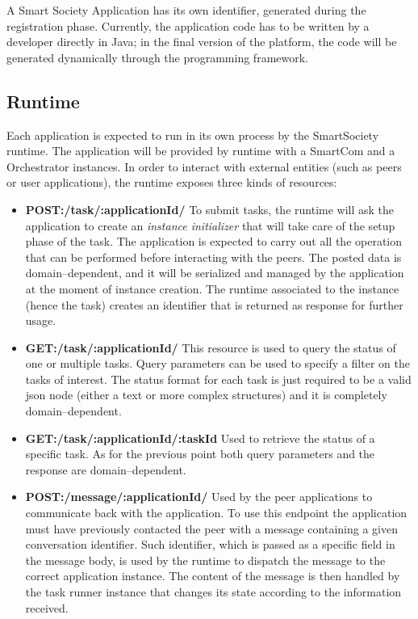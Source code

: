 A Smart Society Application has its own identifier, generated during the registration phase. Currently, the application code has to be written by a developer directly in Java; in the final version of the platform, the code will be generated dynamically through the programming framework. %

\subsection{Runtime}
Each application is expected to run in its own process by the SmartSociety runtime. The application will be provided by runtime with a SmartCom and a Orchestrator instances. In order to interact with external entities (such as peers or user applications), the runtime exposes three kinds of resources:

\begin{itemize}
\item {\bf POST:/task/:applicationId/} To submit tasks, the runtime will ask the application to create an \textit{instance initializer} that will take care of the setup phase of the task. The application is expected to carry out all the operation that can be performed before interacting with the peers. The posted data is domain--dependent, and it will be serialized and managed by the application at the moment of instance creation. The runtime associated to the instance (hence the task) creates an identifier that is returned as response for further usage.

\item {\bf GET:/task/:applicationId/} This resource is used to query the status of one or multiple tasks. Query parameters can be used to specify a filter on the tasks of interest. 
The status format for each task is just required to be a valid json node (either a text or more complex structures) and it is completely domain--dependent. %

\item {\bf GET:/task/:applicationId/:taskId} Used to retrieve the status of a specific task. As for the previous point both query parameters and the response are domain--dependent.

\item {\bf POST:/message/:applicationId/} Used by the peer applications to communicate back with the application. To use this endpoint the application must have previously contacted the peer with a message containing a given conversation identifier. Such identifier, which is passed as a specific field in the message body, is used  by the runtime to dispatch the message to the correct application instance. The content of the message is then handled by the task runner instance that changes its state according to the information received.
\end{itemize}

